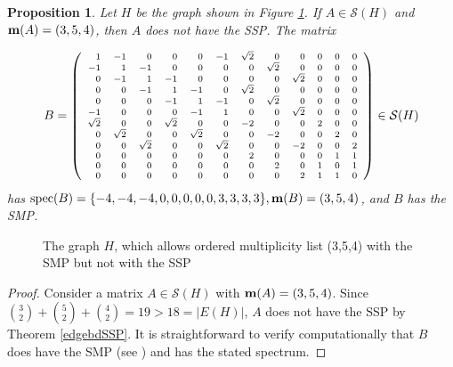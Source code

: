 \documentclass[11pt]{article}
\newtheorem{prop}[thm]{Proposition}
\theoremstyle{definition}
\theoremstyle{definition}
\theoremstyle{definition}
\newcommand{\oml}{{\bf m}}
\newcommand{\bpf}{\begin{proof}}
\newcommand{\epf}{\end{proof}\ms}
\newcommand{\ms}{\medskip}
\newcommand{\mptn}{\mathcal{S}} %
\def\spec{\operatorname{spec}}
\begin{document}
\begin{prop}\label{prop:SMPnotSSP}  Let $H$ be the graph shown in Figure \ref{fig:SMPnotSSP}.  If $A\in\mptn(H)$ and  $\oml(A)=(3,5,4)$, then $A$ does not have the SSP.  The matrix 

\[B=\left(
{\scriptsize\begin{array}{rrrrrrrrrrrr}
 1 & -1 & 0 & 0 & 0 & -1 & \sqrt{2} & 0 & 0 & 0 & 0 & 0 \\
 -1 & 1 & -1 & 0 & 0 & 0 & 0 & \sqrt{2} & 0 & 0 & 0 & 0 \\
 0 & -1 & 1 & -1 & 0 & 0 & 0 & 0 & \sqrt{2} & 0 & 0 & 0 \\
 0 & 0 & -1 & 1 & -1 & 0 & \sqrt{2} & 0 & 0 & 0 & 0 & 0 \\
 0 & 0 & 0 & -1 & 1 & -1 & 0 & \sqrt{2} & 0 & 0 & 0 & 0 \\
 -1 & 0 & 0 & 0 & -1 & 1 & 0 & 0 & \sqrt{2} & 0 & 0 & 0 \\
 \sqrt{2} & 0 & 0 & \sqrt{2} & 0 & 0 & -2 & 0 & 0 & 2 & 0 & 0
   \\
 0 & \sqrt{2} & 0 & 0 & \sqrt{2} & 0 & 0 & -2 & 0 & 0 & 2 & 0
   \\
 0 & 0 & \sqrt{2} & 0 & 0 & \sqrt{2} & 0 & 0 & -2 & 0 & 0 & 2
   \\
 0 & 0 & 0 & 0 & 0 & 0 & 2 & 0 & 0 & 0 & 1 & 1 \\
 0 & 0 & 0 & 0 & 0 & 0 & 0 & 2 & 0 & 1 & 0 & 1 \\
 0 & 0 & 0 & 0 & 0 & 0 & 0 & 0 & 2 & 1 & 1 & 0 
\end{array}}
\right)\in\mptn(H)\]
has  $\spec(B)=\{-4,-4,-4,0,0,0,0,0,3,3,3,3\}, \oml(B)=(3,5,4)$, and $B$ has the SMP.
\end{prop}
\begin{figure}[!h]
\begin{center}
\caption{The graph $H$, which allows ordered multiplicity list (3,5,4) with the SMP but not with the SSP}\label{fig:SMPnotSSP}\vspace{-10pt}
\end{center}
\end{figure}%


\bpf    Consider a matrix $A\in \mptn(H)$ with $\oml(A)=(3,5,4)$.  Since ${3 \choose 2}+{5 \choose 2}+{4 \choose 2}=19>18=|E(H)|$,  $A$ does not have the SSP by Theorem \ref{edgebdSSP}.  It is straightforward to verify computationally that $B$ does have the SMP  (see \cite{suppdocs}) and has the stated spectrum.
\epf\vspace{-10pt}
\end{document}

